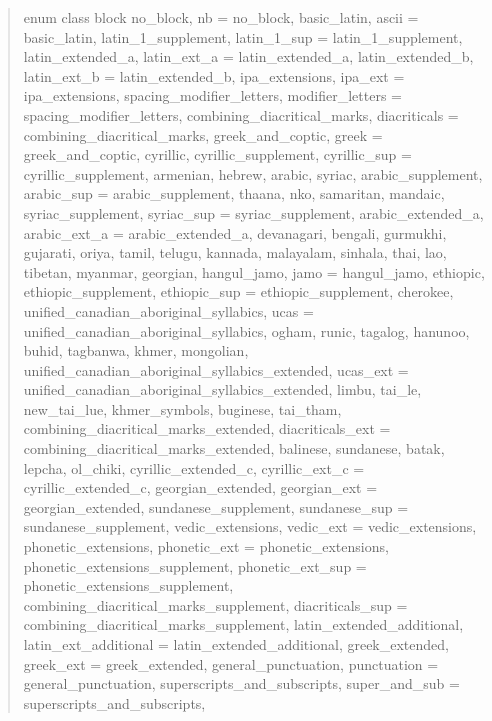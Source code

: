 \documentclass{wg21}
\begin{document}
\begin{quote}
\begin{itemdecl}
enum class block {
    no_block,
    nb = no_block,
    basic_latin,
    ascii = basic_latin,
    latin_1_supplement,
    latin_1_sup = latin_1_supplement,
    latin_extended_a,
    latin_ext_a = latin_extended_a,
    latin_extended_b,
    latin_ext_b = latin_extended_b,
    ipa_extensions,
    ipa_ext = ipa_extensions,
    spacing_modifier_letters,
    modifier_letters = spacing_modifier_letters,
    combining_diacritical_marks,
    diacriticals = combining_diacritical_marks,
    greek_and_coptic,
    greek = greek_and_coptic,
    cyrillic,
    cyrillic_supplement,
    cyrillic_sup = cyrillic_supplement,
    armenian,
    hebrew,
    arabic,
    syriac,
    arabic_supplement,
    arabic_sup = arabic_supplement,
    thaana,
    nko,
    samaritan,
    mandaic,
    syriac_supplement,
    syriac_sup = syriac_supplement,
    arabic_extended_a,
    arabic_ext_a = arabic_extended_a,
    devanagari,
    bengali,
    gurmukhi,
    gujarati,
    oriya,
    tamil,
    telugu,
    kannada,
    malayalam,
    sinhala,
    thai,
    lao,
    tibetan,
    myanmar,
    georgian,
    hangul_jamo,
    jamo = hangul_jamo,
    ethiopic,
    ethiopic_supplement,
    ethiopic_sup = ethiopic_supplement,
    cherokee,
    unified_canadian_aboriginal_syllabics,
    ucas = unified_canadian_aboriginal_syllabics,
    ogham,
    runic,
    tagalog,
    hanunoo,
    buhid,
    tagbanwa,
    khmer,
    mongolian,
    unified_canadian_aboriginal_syllabics_extended,
    ucas_ext = unified_canadian_aboriginal_syllabics_extended,
    limbu,
    tai_le,
    new_tai_lue,
    khmer_symbols,
    buginese,
    tai_tham,
    combining_diacritical_marks_extended,
    diacriticals_ext = combining_diacritical_marks_extended,
    balinese,
    sundanese,
    batak,
    lepcha,
    ol_chiki,
    cyrillic_extended_c,
    cyrillic_ext_c = cyrillic_extended_c,
    georgian_extended,
    georgian_ext = georgian_extended,
    sundanese_supplement,
    sundanese_sup = sundanese_supplement,
    vedic_extensions,
    vedic_ext = vedic_extensions,
    phonetic_extensions,
    phonetic_ext = phonetic_extensions,
    phonetic_extensions_supplement,
    phonetic_ext_sup = phonetic_extensions_supplement,
    combining_diacritical_marks_supplement,
    diacriticals_sup = combining_diacritical_marks_supplement,
    latin_extended_additional,
    latin_ext_additional = latin_extended_additional,
    greek_extended,
    greek_ext = greek_extended,
    general_punctuation,
    punctuation = general_punctuation,
    superscripts_and_subscripts,
    super_and_sub = superscripts_and_subscripts,
}
\end{itemdecl}
\end{quote}
\end{document}
